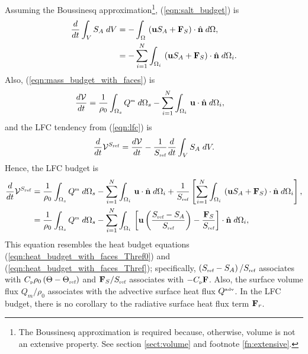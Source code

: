 \documentclass[10pt]{amsart}
\newcommand{\Cp}{C_{\mbox{\tiny p}}}
\newcommand{\Qm}{Q^{\mbox{\tiny m}}}
\newcommand{\Qadv}{Q^{\mbox{\tiny adv}}}
\newcommand{\surf}{\Omega}
\newcommand{\Thref}{\Theta_{\mbox{\tiny ref}}}
\newcommand{\Sref}{S_{\mbox{\tiny ref}}}
\newcommand{\V}{{\mathcal V}}
\newcommand{\LFC}{\V^{\Sref}}
\begin{document}
Assuming the Boussinesq approximation\footnote{The Boussinesq approximation is required because, otherwise, volume is not an extensive property. See section \ref{sect:volume} and footnote \ref{fn:extensive}.}, (\ref{eqn:salt_budget}) is
\begin{align}
\frac{d}{d t} \int_V S_A \; dV  & = - \int_\surf  \, \left( {\bf u} S_A + {\bf F}_S \right) \cdot {\hat{\bf n}} \; d \surf , \nonumber \\
& = - \sum_{i=1}^{N} \int_{\surf_i}  \, \left( {\bf u} S_A + {\bf F}_S \right) \cdot {\hat{\bf n}} \; d \surf_i .
\label{eqn:LFC_budget0}
\end{align}
Also, (\ref{eqn:mass_budget_with_faces}) is
\begin{align}
\frac{d \V }{d t} & = \frac{1}{\rho_0} \int_{\surf_s} \Qm \; d\surf_s  - \sum_{i=1}^N \int_{\surf_i} \, {\bf u} \cdot {\hat{\bf n}}  \; d \surf_i ,
\label{eqn:LFC_budget1}
\end{align}
and the LFC tendency from (\ref{eqn:lfc}) is
\begin{align}
\frac{d}{dt} \LFC = \frac{d \V}{d t} - \frac{1}{\Sref} \frac{d}{dt} \int_V S_A \; dV .
\end{align}
Hence, the LFC budget is
\begin{align}
\frac{d}{dt} \LFC &= 
\frac{1}{\rho_0} \int_{\surf_s} \Qm \; d\surf_s  - \sum_{i=1}^N \int_{\surf_i} \, {\bf u} \cdot {\hat{\bf n}}  \; d \surf_i 
+ \frac{1}{\Sref} \left[
 \sum_{i=1}^N \int_{\surf_i}  \, \left( {\bf u} S_A + {\bf F}_S \right) \cdot {\hat{\bf n}} \; d \surf_i 
\right] , \nonumber \\
&= \frac{1}{\rho_0} \int_{\surf_s} \Qm \; d\surf_s  - \sum_{i=1}^N \int_{\surf_i} \, \left[ {\bf u} \left( \frac{\Sref - S_A}{\Sref} \right) - \frac{{\bf F}_S}{\Sref} \right] \cdot {\hat{\bf n}}  \; d \surf_i , 
\label{eqn:LFC_budget} 
\end{align}
This equation resembles the heat budget equations (\ref{eqn:heat_budget_with_faces_Thref0}) and (\ref{eqn:heat_budget_with_faces_Thref}); specifically, $\left(\Sref - S_A \right) / \Sref $ associates with $\Cp \rho_0 \left( \Theta - \Thref \right)$ and ${\bf F}_S / \Sref$ associates with $-\Cp {\bf F}$.
Also, the surface volume flux $Q_m / \rho_0$ associates with the advective surface heat flux $\Qadv$.
In the LFC budget, there is no corollary to the radiative surface heat flux term ${\bf F}_r$.
\end{document}
